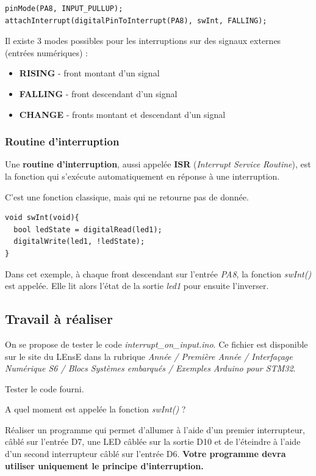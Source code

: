 \documentclass[a4paper,11pt,titlepage]{article} %
\begin{document}
\begin{lstlisting}
pinMode(PA8, INPUT_PULLUP);
attachInterrupt(digitalPinToInterrupt(PA8), swInt, FALLING); 
\end{lstlisting}

Il existe 3 modes possibles pour les interruptions sur des signaux externes (entrées numériques) : 

\begin{itemize}
	\item \textbf{RISING} - front montant d'un signal
	\item \textbf{FALLING} - front descendant d'un signal
	\item \textbf{CHANGE} - fronts montant et descendant d'un signal
\end{itemize}


\subsubsection{Routine d'interruption}

Une \textbf{routine d'interruption}, aussi appelée \textbf{ISR} (\textit{Interrupt Service Routine}), est la fonction qui s'exécute automatiquement en réponse à une interruption. 

C'est une fonction classique, mais qui ne retourne pas de donnée.

\begin{lstlisting}
void swInt(void){
  bool ledState = digitalRead(led1);
  digitalWrite(led1, !ledState);
} 
\end{lstlisting}

Dans cet exemple, à chaque front descendant sur l'entrée \textsl{PA8}, la fonction \textsl{swInt()} est appelée. Elle lit alors l'état de la sortie \textsl{led1} pour ensuite l'inverser.

\subsection{Travail à réaliser}

On se propose de tester le code \textsl{interrupt\_on\_input.ino}. Ce fichier est disponible sur le site du LEnsE dans la rubrique \textit{Année / Première Année / Interfaçage Numérique S6 / Blocs Systèmes embarqués / Exemples Arduino pour STM32}.

\Manip Tester le code fourni. 

\Quest A quel moment est appelée la fonction \textsl{swInt()} ?

\Manip Réaliser un programme qui permet d'allumer à l'aide d'un premier interrupteur, câblé sur l'entrée D7, une LED câblée sur la sortie D10 et de l'éteindre à l'aide d'un second interrupteur câblé sur l'entrée D6. \textbf{Votre programme devra utiliser uniquement le principe d'interruption.}
\end{document}

